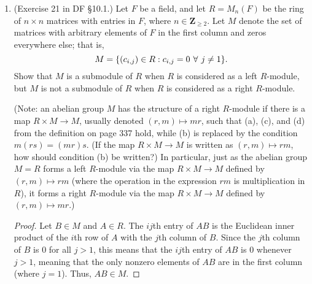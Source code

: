 \documentclass[10pt]{article}
\newcommand{\Q}{\mathbb{Q}}
\newcommand{\Z}{\mathbb{Z}}
\begin{document}
\begin{enumerate}
\begin{proof}
$M$ is naturally a $\Z$-module, defined by some action $r\cdot m = rm$ for all $r \in \Z$, $m \in M$.  Assume, for a contradiction, that this action can be extended to an action of $\Q$ on $M$, defined by $r\cdot m = rm$ for all $r \in \Q$.  This requires that $\dfrac{1}{n}x = y$ for some $y \in M$.  But then we have
$$
x = \left( n \frac1n \right) x = n \left( \frac1n x \right) = ny = 0
$$
(writing $M$ multiplicatively instead, we have that $ny = y^n = 0$ because $M$ has order $n$).  This contradicts our assumption that $x$ was not the identity element, thus such an extension does not exist when $M$ is nontrivial.
\end{proof}

\item (Exercise 21 in DF \S 10.1.) Let $F$ be a field, and let $R = M_n(F)$ be the ring of $n \times n$ matrices with entries in $F$, where $n \in \mathbf{Z}_{\geq 2}$.  Let $M$ denote the set of matrices with arbitrary elements of $F$ in the first column and zeros everywhere else; that is, 
\[
M = \{(c_{i,j}) \in R: c_{i,j}=0 \hspace{.05in} \forall \hspace{.05in} j \neq 1 \} \text{.}
\]
Show that $M$ is a submodule of $R$ when $R$ is considered as a left $R$-module, but $M$ is not a submodule of $R$ when $R$ is considered as a right $R$-module.

(Note: an abelian group $M$ has the structure of a right $R$-module if there is a map $R \times M \rightarrow M$, usually denoted $(r,m) \mapsto mr$, such that (a), (c), and (d) from the definition on page 337 hold, while (b) is replaced by the condition $m(rs)=(mr)s$.  (If the map $R \times M \rightarrow M$ is written as $(r,m) \mapsto rm$, how should condition (b) be written?)  In particular, just as the abelian group $M=R$ forms a left $R$-module via the map $R \times M \rightarrow M$ defined by $(r,m) \mapsto rm$ (where the operation in the expression $rm$ is multiplication in $R$), it forms a right $R$-module via the map $R \times M \rightarrow M$ defined by $(r,m) \mapsto mr$.)

\begin{proof}
Let $B \in M$ and $A \in R$.  The $ij$th entry of $AB$ is the Euclidean inner product of the $i$th row of $A$ with the $j$th column of $B$.  Since the $j$th column of $B$ is $0$ for all $j > 1$, this means that the $ij$th entry of $AB$ is $0$ whenever $j > 1$, meaning that the only nonzero elements of $AB$ are in the first column (where $j=1$).  Thus, $AB \in M$.


\end{proof}
\end{enumerate}
\end{document}
